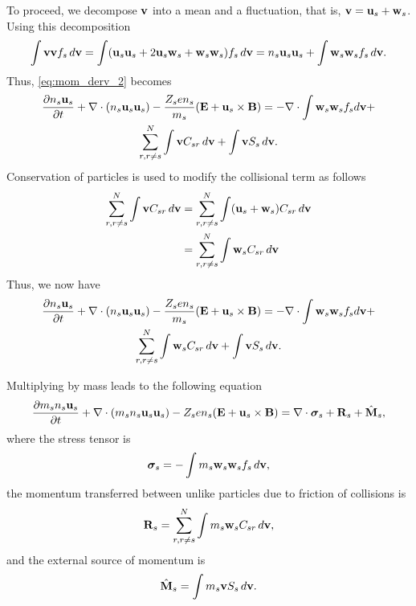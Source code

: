 \documentclass[a4paper,11pt]{report}
\begin{document}
To proceed, we decompose $\mathbf{v}$ into a mean and a fluctuation, that is, $\mathbf{v} = \mathbf{u}_s + \mathbf{w}_s$. Using this decomposition 
\begin{equation}
\label{eq:identity_vv}
\int \mathbf{v} \mathbf{v} f_s \, d\mathbf{v} = \int ( \mathbf{u}_s \mathbf{u}_s + 2 \mathbf{u}_s \mathbf{w}_s + \mathbf{w}_s \mathbf{w}_s) f_s \, d\mathbf{v} = n_s \mathbf{u}_s \mathbf{u}_s + \int \mathbf{w}_s \mathbf{w}_s f_s \, d\mathbf{v}.
\end{equation}
Thus, \cref{eq:mom_derv_2} becomes
\begin{multline}
\label{eq:mom_derv_3}
\frac{\partial n_s \mathbf{u}_s}{\partial t} + \nabla \cdot \left ( n_s \mathbf{u}_s \mathbf{u}_s \right) - \frac{Z_s e n_s}{m_s} ( \mathbf{E} + \mathbf{u}_s \times \mathbf{B} ) = -\nabla \cdot \int \mathbf{w}_s \mathbf{w}_s f_s d\mathbf{v} + \\
\sum_{r, r \ne s}^N \int \mathbf{v} C_{s r} \, d\mathbf{v} + \int \mathbf{v} S_s \, d\mathbf{v}.
\end{multline}
Conservation of particles is used to modify the collisional term as follows
\begin{align}
    \label{eq:mom_collision_expansion}
    \sum_{r,r \ne s}^N \int \mathbf{v} C_{s r} \, d\mathbf{v} 
    &= \sum_{r,r \ne s}^N \int (\mathbf{u}_s + \mathbf{w}_s) C_{s r} \, d\mathbf{v} \nonumber \\
    &= \sum_{r,r \ne s}^N \int \mathbf{w}_s C_{s r} \, d\mathbf{v} 
\end{align}
Thus, we now have
\begin{multline}
\label{eq:mom_derv_4}
\frac{\partial n_s \mathbf{u}_s}{\partial t} + \nabla \cdot \left ( n_s \mathbf{u}_s \mathbf{u}_s \right) - \frac{Z_s e n_s}{m_s} ( \mathbf{E} + \mathbf{u}_s \times \mathbf{B} ) = -\nabla \cdot \int \mathbf{w}_s \mathbf{w}_s f_s d\mathbf{v} + \\
\sum_{r, r \ne s}^N \int \mathbf{w}_s C_{s r} \, d\mathbf{v} + \int \mathbf{v} S_s \, d\mathbf{v}.
\end{multline}

Multiplying by mass leads to the following equation
\begin{equation}
\label{eq:mom_derv_5}
\frac{\partial m_s n_s \mathbf{u}_s}{\partial t} + \nabla \cdot \left ( m_s n_s \mathbf{u}_s \mathbf{u}_s \right) - Z_s e n_s ( \mathbf{E} + \mathbf{u}_s \times \mathbf{B} ) = \nabla \cdot \boldsymbol{\sigma}_s + \mathbf{R}_s + \hat{\mathbf{M}}_s,
\end{equation}
where the stress tensor is
\begin{equation}
\boldsymbol{\sigma}_s = -\int m_s \mathbf{w}_s \mathbf{w}_s f_s \, d\mathbf{v},
\end{equation}
the momentum transferred between unlike particles due to friction of collisions is
\begin{equation}
\mathbf{R}_s = \sum_{r, r \ne s}^N \int m_s \mathbf{w}_s C_{s r} \, d\mathbf{v},
\end{equation}
and the external source of momentum is
\begin{equation}
\hat{\mathbf{M}}_s = \int m_s \mathbf{v} S_s \, d\mathbf{v}.
\end{equation}
 
\end{document}
